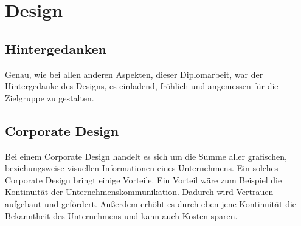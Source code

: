 \chapter{Design}
\renewcommand{\kapitelautor}{Autor: Niklas Kienreich}

\section{Hintergedanken}
Genau, wie bei allen anderen Aspekten, dieser Diplomarbeit, war der Hintergedanke des Designs, es einladend, fröhlich und angemessen für die Zielgruppe zu gestalten.

\section{Corporate Design}
Bei einem Corporate Design handelt es sich um die Summe aller grafischen, beziehungsweise visuellen Informationen eines Unternehmens. Ein solches Corporate Design bringt einige Vorteile.
Ein Vorteil wäre zum Beispiel die Kontinuität der Unternehmenskommunikation. Dadurch wird Vertrauen aufgebaut und gefördert. Außerdem erhöht es durch eben jene Kontinuität die Bekanntheit des Unternehmens und kann auch Kosten sparen. \cite{corporate}
